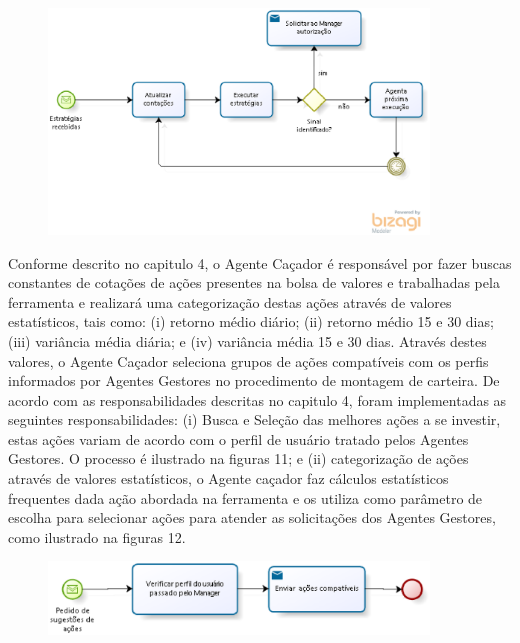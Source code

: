 \begin{apendicesenv}
\begin{figure}[h]
\centering
\label{f10}
\includegraphics[width=0.9\textwidth]{figuras/f40}
\end{figure}

Conforme descrito no capitulo 4, o Agente Caçador é responsável por fazer buscas constantes de cotações de ações presentes na bolsa de valores e trabalhadas pela ferramenta e realizará uma categorização destas ações através de valores estatísticos, tais como: (i) retorno médio diário; (ii) retorno médio 15 e 30 dias; (iii) variância média diária; e (iv) variância média 15 e 30 dias. Através destes valores, o Agente Caçador seleciona grupos de ações compatíveis com os perfis informados por Agentes Gestores no procedimento de montagem de carteira. De acordo com as responsabilidades descritas no capitulo 4, foram implementadas as seguintes responsabilidades: (i) Busca e Seleção das melhores ações a se investir, estas ações variam de acordo com o perfil de usuário tratado pelos Agentes Gestores. O processo é ilustrado na figuras 11; e (ii) categorização de ações através de valores estatísticos, o Agente caçador faz cálculos estatísticos frequentes dada ação abordada na ferramenta e os utiliza como parâmetro de escolha para selecionar ações para atender as solicitações dos Agentes Gestores, como ilustrado na figuras 12.

\begin{figure}[h]
\centering
\label{f11}
\includegraphics[width=0.9\textwidth]{figuras/f42}
\end{figure}


\end{apendicesenv}
